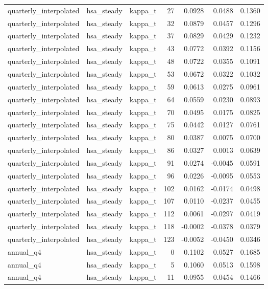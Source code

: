 \begin{tabular}{lllrrrr}
quarterly\_interpolated & hsa\_steady & kappa\_t & 27 & 0.0928 & 0.0488 & 0.1360 \\
quarterly\_interpolated & hsa\_steady & kappa\_t & 32 & 0.0879 & 0.0457 & 0.1296 \\
quarterly\_interpolated & hsa\_steady & kappa\_t & 37 & 0.0829 & 0.0429 & 0.1232 \\
quarterly\_interpolated & hsa\_steady & kappa\_t & 43 & 0.0772 & 0.0392 & 0.1156 \\
quarterly\_interpolated & hsa\_steady & kappa\_t & 48 & 0.0722 & 0.0355 & 0.1091 \\
quarterly\_interpolated & hsa\_steady & kappa\_t & 53 & 0.0672 & 0.0322 & 0.1032 \\
quarterly\_interpolated & hsa\_steady & kappa\_t & 59 & 0.0613 & 0.0275 & 0.0961 \\
quarterly\_interpolated & hsa\_steady & kappa\_t & 64 & 0.0559 & 0.0230 & 0.0893 \\
quarterly\_interpolated & hsa\_steady & kappa\_t & 70 & 0.0495 & 0.0175 & 0.0825 \\
quarterly\_interpolated & hsa\_steady & kappa\_t & 75 & 0.0442 & 0.0127 & 0.0761 \\
quarterly\_interpolated & hsa\_steady & kappa\_t & 80 & 0.0387 & 0.0075 & 0.0700 \\
quarterly\_interpolated & hsa\_steady & kappa\_t & 86 & 0.0327 & 0.0013 & 0.0639 \\
quarterly\_interpolated & hsa\_steady & kappa\_t & 91 & 0.0274 & -0.0045 & 0.0591 \\
quarterly\_interpolated & hsa\_steady & kappa\_t & 96 & 0.0226 & -0.0095 & 0.0553 \\
quarterly\_interpolated & hsa\_steady & kappa\_t & 102 & 0.0162 & -0.0174 & 0.0498 \\
quarterly\_interpolated & hsa\_steady & kappa\_t & 107 & 0.0110 & -0.0237 & 0.0455 \\
quarterly\_interpolated & hsa\_steady & kappa\_t & 112 & 0.0061 & -0.0297 & 0.0419 \\
quarterly\_interpolated & hsa\_steady & kappa\_t & 118 & -0.0002 & -0.0378 & 0.0379 \\
quarterly\_interpolated & hsa\_steady & kappa\_t & 123 & -0.0052 & -0.0450 & 0.0346 \\
annual\_q4 & hsa\_steady & kappa\_t & 0 & 0.1102 & 0.0527 & 0.1685 \\
annual\_q4 & hsa\_steady & kappa\_t & 5 & 0.1060 & 0.0513 & 0.1598 \\
annual\_q4 & hsa\_steady & kappa\_t & 11 & 0.0955 & 0.0454 & 0.1466 \\

\end{tabular}
